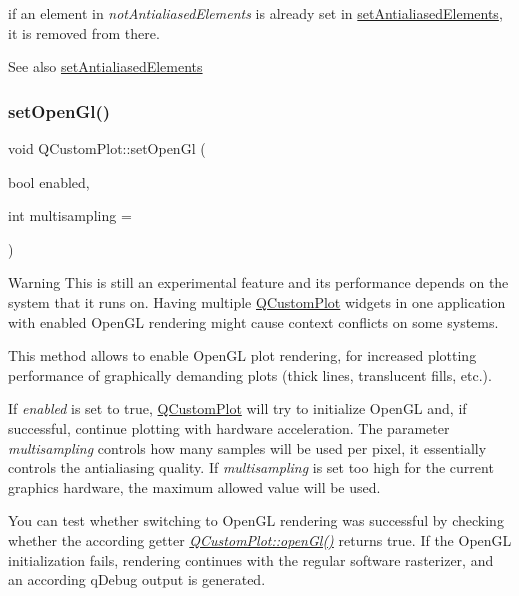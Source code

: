 if an element in {\itshape not\+Antialiased\+Elements} is already set in \mbox{\hyperlink{class_q_custom_plot_af6f91e5eab1be85f67c556e98c3745e8}{set\+Antialiased\+Elements}}, it is removed from there.

\begin{DoxySeeAlso}{See also}
\mbox{\hyperlink{class_q_custom_plot_af6f91e5eab1be85f67c556e98c3745e8}{set\+Antialiased\+Elements}} 
\end{DoxySeeAlso}
\mbox{\label{class_q_custom_plot_a7db1adc09016329f3aef7c60da935789}} 
\subsubsection{\texorpdfstring{setOpenGl()}{setOpenGl()}}
{\footnotesize\ttfamily void Q\+Custom\+Plot\+::set\+Open\+Gl (\begin{DoxyParamCaption}\item[{bool}]{enabled,  }\item[{int}]{multisampling = {} }\end{DoxyParamCaption})}

\begin{DoxyWarning}{Warning}
This is still an experimental feature and its performance depends on the system that it runs on. Having multiple \mbox{\hyperlink{class_q_custom_plot}{Q\+Custom\+Plot}} widgets in one application with enabled Open\+GL rendering might cause context conflicts on some systems.
\end{DoxyWarning}
This method allows to enable Open\+GL plot rendering, for increased plotting performance of graphically demanding plots (thick lines, translucent fills, etc.).

If {\itshape enabled} is set to true, \mbox{\hyperlink{class_q_custom_plot}{Q\+Custom\+Plot}} will try to initialize Open\+GL and, if successful, continue plotting with hardware acceleration. The parameter {\itshape multisampling} controls how many samples will be used per pixel, it essentially controls the antialiasing quality. If {\itshape multisampling} is set too high for the current graphics hardware, the maximum allowed value will be used.

You can test whether switching to Open\+GL rendering was successful by checking whether the according getter {\itshape \mbox{\hyperlink{class_q_custom_plot_abe5556ac80dc0140fd57f2b2f94a1f0e}{Q\+Custom\+Plot\+::open\+Gl()}}} returns true. If the Open\+GL initialization fails, rendering continues with the regular software rasterizer, and an according q\+Debug output is generated.


